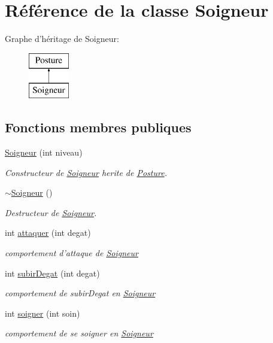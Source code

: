 \hypertarget{classSoigneur}{\section{Référence de la classe Soigneur}
\label{classSoigneur}
}
Graphe d'héritage de Soigneur\-:\begin{figure}[H]
\begin{center}
\leavevmode
\includegraphics[height=2.000000cm]{classSoigneur}
\end{center}
\end{figure}
\subsection*{Fonctions membres publiques}
\begin{DoxyCompactItemize}
\item 
\hyperlink{classSoigneur_a1b2ad1c5e5b338bb4ef75d137a81e290}{Soigneur} (int niveau)
\begin{DoxyCompactList}\small\item\em Constructeur de \hyperlink{classSoigneur}{Soigneur} herite de \hyperlink{classPosture}{Posture}. \end{DoxyCompactList}\item 
\hypertarget{classSoigneur_ab2c59b538fee3f08fda30fcc8cc5449b}{\hyperlink{classSoigneur_ab2c59b538fee3f08fda30fcc8cc5449b}{$\sim$\-Soigneur} ()}\label{classSoigneur_ab2c59b538fee3f08fda30fcc8cc5449b}

\begin{DoxyCompactList}\small\item\em Destructeur de \hyperlink{classSoigneur}{Soigneur}. \end{DoxyCompactList}\item 
int \hyperlink{classSoigneur_a94fa5f3bdffca0f474777d82a5f4b3e6}{attaquer} (int degat)
\begin{DoxyCompactList}\small\item\em comportement d'attaque de \hyperlink{classSoigneur}{Soigneur} \end{DoxyCompactList}\item 
int \hyperlink{classSoigneur_a7083e65720a01be6862ea640bf6d11c8}{subir\-Degat} (int degat)
\begin{DoxyCompactList}\small\item\em comportement de subir\-Degat en \hyperlink{classSoigneur}{Soigneur} \end{DoxyCompactList}\item 
int \hyperlink{classSoigneur_a0f229f05071a0a2819906678f6fbaaae}{soigner} (int soin)
\begin{DoxyCompactList}\small\item\em comportement de se soigner en \hyperlink{classSoigneur}{Soigneur} \end{DoxyCompactList}\end{DoxyCompactItemize}

